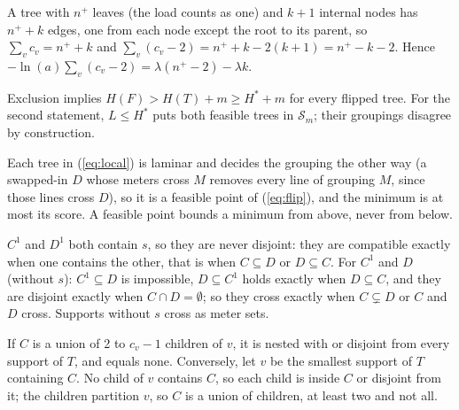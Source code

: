 \documentclass[journal,onecolumn,11pt]{IEEEtran}
\newcommand{\Sset}{\mathcal{S}}
\begin{document}
\begin{IEEEproof}
A tree with $n^+$ leaves (the load counts as one) and $k+1$ internal nodes has $n^++k$ edges, one from each node except the
root to its parent, so $\sum_vc_v=n^++k$ and $\sum_v(c_v-2)=n^++k-2(k+1)=n^+-k-2$. Hence
$-\ln(a)\sum_v(c_v-2)=\lambda(n^+-2)-\lambda k$.
\end{IEEEproof}

\begin{IEEEproof}
Exclusion implies $H(F)>H(T)+m\ge H^*+m$ for every flipped tree. For the second statement,
$L\le H^*$ puts both feasible trees in $\Sset_m$; their groupings disagree by construction.
\end{IEEEproof}

\begin{IEEEproof}
Each tree in (\ref{eq:local}) is laminar and decides the grouping the other way (a swapped-in $D$ whose meters cross $M$
removes every line of grouping $M$, since those lines cross $D$), so it is a feasible point of (\ref{eq:flip}), and the
minimum is at most its score. A feasible point bounds a minimum from above, never from below.
\end{IEEEproof}

\begin{IEEEproof}
$C^1$ and $D^1$ both contain $s$, so they are never disjoint: they are compatible exactly when one contains the other, that
is when $C\subseteq D$ or $D\subseteq C$. For $C^1$ and $D$ (without $s$): $C^1\subseteq D$ is impossible, $D\subseteq C^1$
holds exactly when $D\subseteq C$, and they are disjoint exactly when $C\cap D=\emptyset$; so they cross exactly when
$C\subsetneq D$ or $C$ and $D$ cross. Supports without $s$ cross as meter sets.
\end{IEEEproof}

\begin{IEEEproof}
If $C$ is a union of 2 to $c_v-1$ children of $v$, it is nested with or disjoint from every support of $T$, and equals none.
Conversely, let $v$ be the smallest support of $T$ containing $C$. No child of $v$ contains $C$, so each child is inside $C$
or disjoint from it; the children partition $v$, so $C$ is a union of children, at least two and not all.
\end{IEEEproof}
\end{document}
